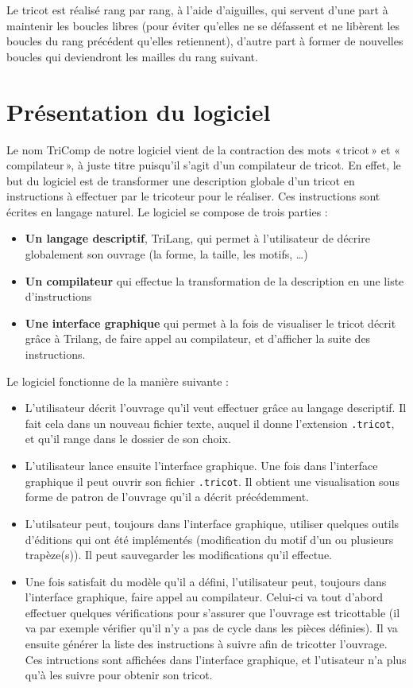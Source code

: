 \documentclass{article}
\begin{document}
Le tricot est réalisé rang par rang, à l'aide d'aiguilles, qui servent 
d'une part à maintenir les boucles libres (pour éviter qu'elles ne se 
défassent et ne libèrent les boucles du rang précédent qu'elles retiennent), 
d'autre part à former de nouvelles boucles qui deviendront les mailles du rang 
suivant.

\newpage

\section{Présentation du logiciel}

Le nom TriComp de notre logiciel vient de la contraction des mots «\,tricot\,» et «\,compilateur\,», 
à juste titre puisqu'il s'agit d'un compilateur de tricot. En effet, le but du logiciel est de 
transformer une description globale d'un tricot en instructions à effectuer par le tricoteur 
pour le réaliser. Ces instructions sont écrites en langage naturel. Le logiciel se compose de trois parties :
\begin{itemize}
 \item \textbf{Un langage descriptif}, TriLang, qui permet à l'utilisateur de décrire globalement son ouvrage (la forme, la taille, les motifs, \dots)
 \item \textbf{Un compilateur} qui effectue la transformation de la description en une liste d'instructions
 \item \textbf{Une interface graphique} qui permet à la fois de visualiser le tricot décrit grâce à Trilang, 
   de faire appel au compilateur, et d'afficher la suite des instructions. \\
\end{itemize}

Le logiciel fonctionne de la manière suivante :
\begin{itemize}
 \item L'utilisateur décrit l'ouvrage qu'il veut effectuer grâce au langage descriptif. Il fait cela dans un nouveau fichier texte, auquel il donne l'extension \texttt{.tricot}, et qu'il range dans le dossier de son choix.
 \item L'utilisateur lance ensuite l'interface graphique. Une fois dans l'interface graphique il peut ouvrir son fichier \texttt{.tricot}. Il obtient une visualisation sous forme de patron de l'ouvrage qu'il a décrit précédemment.
 \item L'utilsateur peut, toujours dans l'interface graphique, utiliser quelques outils d'éditions qui ont été implémentés (modification du motif d'un ou plusieurs trapèze(s)). Il peut sauvegarder les modifications qu'il effectue.
 \item Une fois satisfait du modèle qu'il a défini, l'utilisateur peut, toujours dans l'interface graphique, faire appel au compilateur. Celui-ci va tout d'abord effectuer quelques vérifications pour s'assurer que l'ouvrage est tricottable (il va par exemple vérifier qu'il n'y a pas de cycle dans les pièces définies). Il va ensuite générer la liste des instructions à suivre afin de tricotter l'ouvrage. Ces intructions sont affichées dans l'interface graphique, et l'utisateur n'a plus qu'à les suivre pour obtenir son tricot.
\end{itemize}
\end{document}
